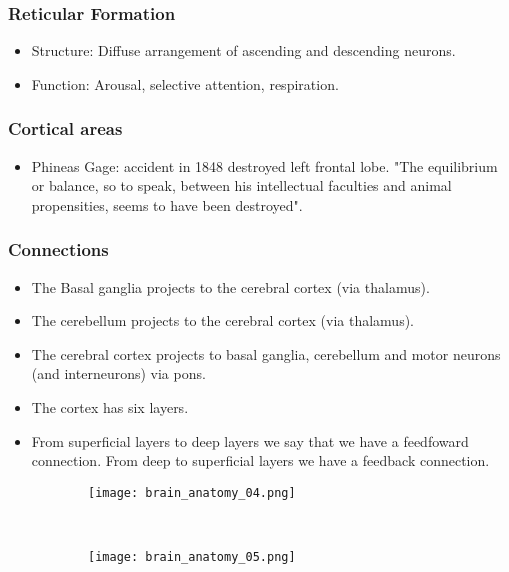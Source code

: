 \documentclass[main]{subfiles}
\begin{document}
\subsubsection{Reticular Formation}
\begin{itemize}[noitemsep,nolistsep]
	\item Structure: Diffuse arrangement of ascending and descending neurons.
	\item Function: Arousal, selective attention, respiration.
\end{itemize}

\subsubsection{Cortical areas}
\begin{itemize}
\item Phineas Gage: accident in 1848 destroyed left frontal lobe. "The equilibrium or balance, so to speak, between his intellectual faculties and animal propensities, seems to have been destroyed".
\end{itemize}
\subsubsection{Connections}
\begin{itemize}[noitemsep,nolistsep]
	\item The Basal ganglia projects to the cerebral cortex (via thalamus).
	\item The cerebellum projects to the cerebral cortex (via thalamus).
	\item The cerebral cortex projects to basal ganglia, cerebellum and motor neurons (and interneurons) via pons.
	\item The cortex has six layers.
	\item From superficial layers to deep layers we say that we have a feedfoward connection.	From deep to superficial layers we have a feedback connection.
	
\end{itemize}

\begin{figure}[H]
	\centering
	\begin{subfigure}[b]{0.5\textwidth}
		\centering
		\texttt{[image: brain\_anatomy\_04.png]}
	\end{subfigure}%
	~
	\begin{subfigure}[b]{0.5\textwidth}
		\centering
		\texttt{[image: brain\_anatomy\_05.png]}
	\end{subfigure}
\end{figure}
\end{document}
